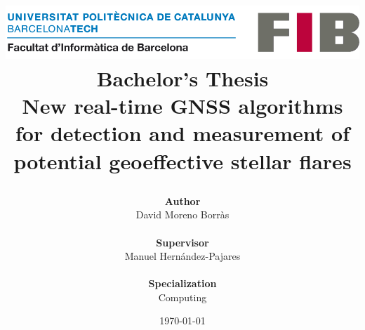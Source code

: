 \title{
	{
	\includegraphics[width=0.7\linewidth]{images/cover/logo-fib.png}	
	\vspace{1cm}
	\textbf{Bachelor's Thesis} \\
	\large New real-time GNSS algorithms for detection and measurement of potential geoeffective stellar flares}
\author{\textbf{Author}\\
	David Moreno Borr\`as
	\\ \\
	\textbf{Supervisor}\\
	Manuel Hernández-Pajares
	\\ \\
	\textbf{Specialization}\\
	Computing
} 
	\vspace{1.3cm}
\date{\today}
}
\maketitle
\thispagestyle{empty}